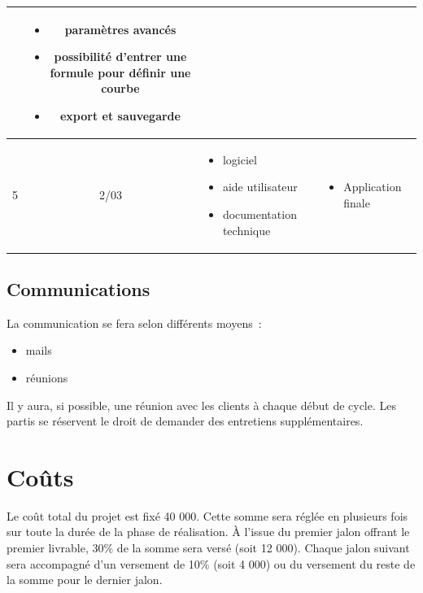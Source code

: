 \documentclass{scrartcl}
\begin{document}
\begin{tabular}{|c|c|p{4cm}|p{7.5cm}|}
\begin{itemize}
			\end{itemize}& 
			\begin{itemize}
				\item paramètres avancés
				\item possibilité d'entrer une formule pour définir une courbe
				\item export et sauvegarde
			\end{itemize} \\
			\hline
			5 & 2/03 &\begin{itemize}
				\item logiciel
				\item aide utilisateur
				\item documentation technique
			\end{itemize}&
			\begin{itemize}\item Application finale\end{itemize}\\
			\hline
		\end{tabular}


	\subsection{Communications}
		La communication se fera selon différents moyens~:
			\begin{itemize}
				\item mails
				\item réunions
			\end{itemize}
			
		Il y aura, si possible, une réunion avec les clients à chaque début de cycle. Les partis se réservent le droit de demander des entretiens supplémentaires.




\section{Coûts}
	Le coût total du projet est fixé 40 000\Euro{}. Cette somme sera réglée en plusieurs fois sur toute la durée de la phase de réalisation. À l'issue du premier jalon offrant le premier livrable, 30\% de la somme sera versé (soit 12 000\Euro{}). Chaque jalon suivant sera accompagné d'un versement de 10\% (soit 4 000\Euro{}) ou du versement du reste de la somme pour le dernier jalon.
\end{document}
